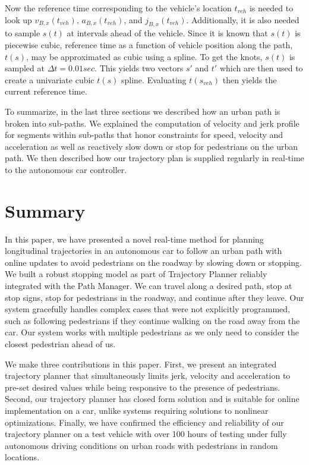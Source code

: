\documentclass[letterpaper, 10 pt, conference]{ieeeconf}  %
\begin{document}
Now the reference time corresponding to the vehicle's location $t_{veh}$ is needed to look up $v_{B,x}(t_{veh})$, $a_{B,x}(t_{veh})$, and $j_{B,x}(t_{veh})$.
Additionally, it is also needed to sample $s(t)$ at intervals ahead of the vehicle.
Since it is known that $s(t)$ is piecewise cubic, reference time as a function of vehicle position along the path, $t(s)$, may be approximated as cubic using a spline.
To get the knots, $s(t)$ is sampled at $\Delta t = 0.01 sec$.
This yields two vectors $s'$ and $t'$ which are then used to create a univariate cubic $t(s)$ spline.
Evaluating $t(s_{veh})$ then yields the current reference time.


To summarize, in the last three sections we described how an urban path is broken into sub-paths. We 
explained the computation of velocity and jerk profile for segments within sub-paths that honor constraints
for speed, velocity and acceleration as well as reactively slow down or stop for pedestrians on
the urban path. We then described how our trajectory plan is supplied regularly in real-time to the
autonomous car controller.

\section{Summary} \label{sec:summary}


In this paper, we have presented a novel real-time method for planning longitudinal trajectories 
in an autonomous car to follow an urban path with online updates to avoid pedestrians on the roadway by slowing down or 
stopping. We built a robust stopping model as part of Trajectory Planner reliably integrated with 
the Path Manager.
We can travel along a desired path, stop at stop signs, stop for pedestrians in the roadway, and continue after 
they leave. Our system gracefully handles complex cases that were not explicitly programmed, such as following 
pedestrians if they continue walking on the road away from the car. Our system works with multiple 
pedestrians as we only need to consider the closest pedestrian ahead of us. 

We make three contributions in this paper. First, we present an integrated trajectory planner that
simultaneously limits jerk, velocity and acceleration to pre-set desired values while being responsive 
to the presence of pedestrians.
Second, our trajectory planner has closed form solution and is suitable for online implementation
on a car, unlike systems requiring solutions to nonlinear optimizations. Finally, we have confirmed the
efficiency and reliability of our trajectory planner on a test vehicle with over 100 hours of testing
under fully autonomous driving conditions on urban roads with pedestrians in random locations. 
\end{document}
